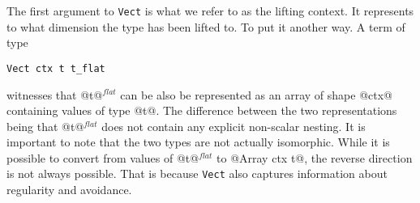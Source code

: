 The first argument to \lstinline[style=ndp]{Vect} is what we refer to as the lifting context. It represents to what dimension the type has been lifted to. To put it another way. A term of type
%
\begin{lstlisting}[style=ndp]
Vect ctx t t_flat
\end{lstlisting}
%
witnesses that @t@$^{\textit{flat}}$ can be also be represented as an array of shape @ctx@ containing values of type @t@. The difference between the two representations being that @t@$^{\textit{flat}}$ does not contain any explicit non-scalar nesting. It is important to note that the two types are not actually isomorphic. While it is possible to convert from values of @t@$^{\textit{flat}}$ to @Array ctx t@, the reverse direction is not always possible. That is because \lstinline[style=ndp]{Vect} also captures information about regularity and avoidance.


